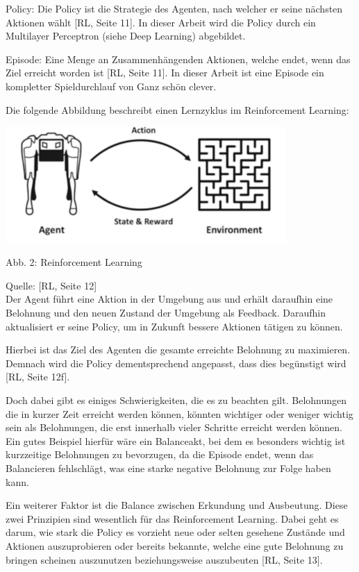 Policy: Die Policy ist die Strategie des Agenten, nach welcher er seine nächsten Aktionen wählt [RL, Seite 11]. In dieser Arbeit wird die Policy durch ein Multilayer Perceptron (siehe Deep Learning) abgebildet.

Episode: Eine Menge an Zusammenhängenden Aktionen, welche endet, wenn das Ziel erreicht worden ist [RL, Seite 11]. In dieser Arbeit ist eine Episode ein kompletter Spieldurchlauf von Ganz schön clever.


Die folgende Abbildung beschreibt einen Lernzyklus im Reinforcement Learning:

\vspace{0.5cm}
\includegraphics[width=0.8\textwidth]{Bilder/rl}

Abb. 2: Reinforcement Learning

Quelle: [RL, Seite 12]\\


Der Agent führt eine Aktion in der Umgebung aus und erhält daraufhin eine Belohnung und den neuen Zustand der Umgebung als Feedback. Daraufhin aktualisiert er seine Policy, um in Zukunft bessere Aktionen tätigen zu können.

Hierbei ist das Ziel des Agenten die gesamte erreichte Belohnung zu maximieren. Demnach wird die Policy dementsprechend angepasst, dass dies begünstigt wird [RL, Seite 12f].

Doch dabei gibt es einiges Schwierigkeiten, die es zu beachten gilt. Belohnungen die in kurzer Zeit erreicht werden können, könnten wichtiger oder weniger wichtig sein als Belohnungen, die erst innerhalb vieler Schritte erreicht werden können. Ein gutes Beispiel hierfür wäre ein Balanceakt, bei dem es besonders wichtig ist kurzzeitige Belohnungen zu bevorzugen, da die Episode endet, wenn das Balancieren fehlschlägt, was eine starke negative Belohnung zur Folge haben kann.

Ein weiterer Faktor ist die Balance zwischen Erkundung und Ausbeutung. Diese zwei Prinzipien sind wesentlich für das Reinforcement Learning. Dabei geht es darum, wie stark die Policy es vorzieht neue oder selten gesehene Zustände und Aktionen auszuprobieren oder bereits bekannte, welche eine gute Belohnung zu bringen scheinen auszunutzen beziehungsweise auszubeuten [RL, Seite 13].
